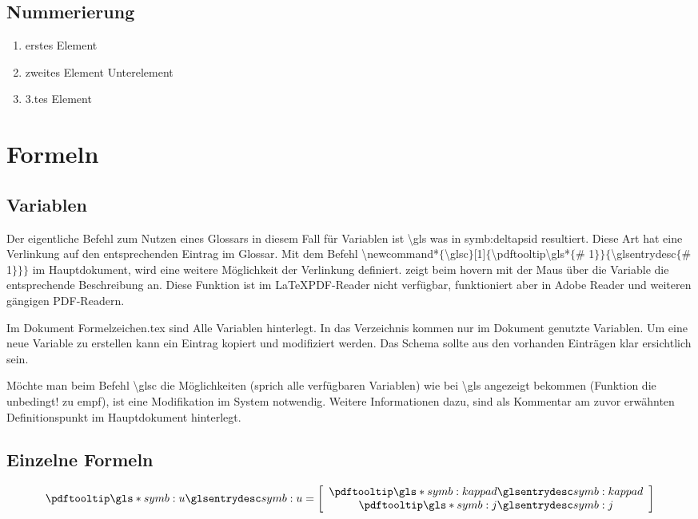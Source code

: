 \subsection{Nummerierung}
\begin{enumerate}
	\item erstes Element
	\item zweites Element
	\subitem  Unterelement
	\item 3.tes Element
\end{enumerate}

\section{Formeln}
\subsection{Variablen}
Der eigentliche Befehl zum Nutzen eines Glossars in diesem Fall für Variablen ist \textbackslash gls was in \gls{symb:deltapsid} resultiert. Diese Art hat eine Verlinkung auf den entsprechenden Eintrag im Glossar. Mit dem Befehl \textbackslash newcommand*$\lbrace$\textbackslash glsc$\rbrace$[1]$\lbrace$\textbackslash pdftooltip\textbackslash gls*$\lbrace$\# 1$\rbrace$$\rbrace$$\lbrace$\textbackslash glsentrydesc$\lbrace$\# 1$\rbrace$$\rbrace$$\rbrace$ im Hauptdokument, wird eine weitere Möglichkeit der Verlinkung definiert.  zeigt beim hovern mit der Maus über die Variable die entsprechende Beschreibung an. Diese Funktion ist im \LaTeX PDF-Reader nicht verfügbar, funktioniert aber in Adobe Reader und weiteren gängigen PDF-Readern.

Im Dokument Formelzeichen.tex sind Alle Variablen hinterlegt. In das Verzeichnis kommen nur im Dokument genutzte Variablen. Um eine neue Variable zu erstellen kann ein Eintrag kopiert und modifiziert werden. Das Schema sollte aus den vorhanden Einträgen klar ersichtlich sein. 

Möchte man beim Befehl \textbackslash glsc die Möglichkeiten (sprich alle verfügbaren Variablen) wie bei \textbackslash gls angezeigt bekommen (Funktion die unbedingt! zu empf), ist eine Modifikation im System notwendig. Weitere Informationen dazu, sind als Kommentar am zuvor erwähnten Definitionspunkt im Hauptdokument hinterlegt.

\subsection{Einzelne Formeln}
\begin{equation}
\glsc{symb:u}=\left[ \begin{array}{c} \glsc{symb:kappad} \\ \glsc{symb:j} \end{array} \right] 
\end{equation}

